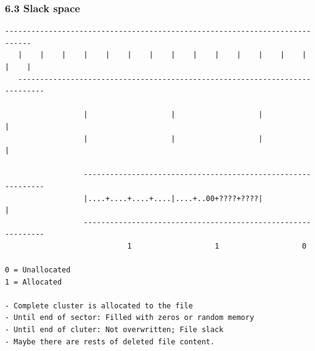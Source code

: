 \begin{frame}[fragile]
  \frametitle{6.3 Slack space}
  \begin{lstlisting}[basicstyle=\tiny\ttfamily]
   ----------------------------------------------------------------------------
   |    |    |    |    |    |    |    |    |    |    |    |    |    |    |    |
   ----------------------------------------------------------------------------

                  |                   |                   |                   |
                  |                   |                   |                   |

                  -------------------------------------------------------------
                  |....+....+....+....|....+..00+????+????|                   |
                  -------------------------------------------------------------
                            1                   1                   0 

0 = Unallocated
1 = Allocated

- Complete cluster is allocated to the file
- Until end of sector: Filled with zeros or random memory
- Until end of cluter: Not overwritten; File slack
- Maybe there are rests of deleted file content.
  \end{lstlisting}
\end{frame}


